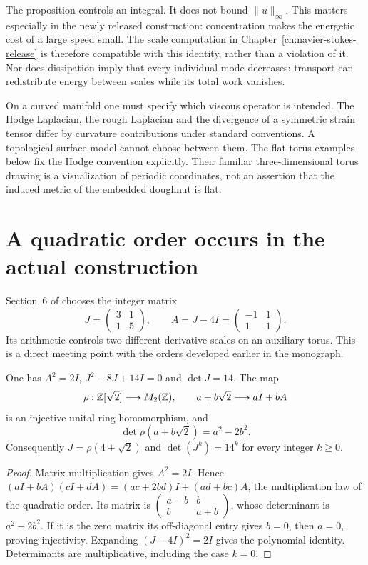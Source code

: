 The proposition controls an integral. It does not bound $\|u\|_\infty$. This matters especially in the newly released construction: concentration makes the energetic cost of a large speed small. The scale computation in Chapter~\ref{ch:navier-stokes-release} is therefore compatible with this identity, rather than a violation of it. Nor does dissipation imply that every individual mode decreases: transport can redistribute energy between scales while its total work vanishes.

On a curved manifold one must specify which viscous operator is intended. The Hodge Laplacian, the rough Laplacian and the divergence of a symmetric strain tensor differ by curvature contributions under standard conventions. A topological surface model cannot choose between them. The flat torus examples below fix the Hodge convention explicitly. Their familiar three-dimensional torus drawing is a visualization of periodic coordinates, not an assertion that the induced metric of the embedded doughnut is flat.

\section{A quadratic order occurs in the actual construction}

Section~6 of \citet{NSOpenAI2026} chooses the integer matrix
\[
 J=\begin{pmatrix}3&1\\1&5\end{pmatrix},\qquad
 A=J-4I=\begin{pmatrix}-1&1\\1&1\end{pmatrix}.
\]
Its arithmetic controls two different derivative scales on an auxiliary torus. This is a direct meeting point with the orders developed earlier in the monograph.

\begin{proposition}
\label{prop:fluid-order}
One has $A^2=2I$, $J^2-8J+14I=0$ and $\det J=14$. The map
\[
 \rho:\mathbb{Z}[\sqrt2]\longrightarrow M_2(\mathbb{Z}),\qquad
 a+b\sqrt2\longmapsto aI+bA
\]
is an injective unital ring homomorphism, and
\[
 \det\rho(a+b\sqrt2)=a^2-2b^2.
\]
Consequently $J=\rho(4+\sqrt2)$ and $\det(J^k)=14^k$ for every integer $k\ge0$.
\end{proposition}
\begin{proof}
Matrix multiplication gives $A^2=2I$. Hence
$(aI+bA)(cI+dA)=(ac+2bd)I+(ad+bc)A$, the multiplication law of the quadratic order. Its matrix is
$\left(\begin{smallmatrix}a-b&b\\b&a+b\end{smallmatrix}\right)$, whose determinant is $a^2-2b^2$. If it is the zero matrix its off-diagonal entry gives $b=0$, then $a=0$, proving injectivity. Expanding $(J-4I)^2=2I$ gives the polynomial identity. Determinants are multiplicative, including the case $k=0$.
\end{proof}

